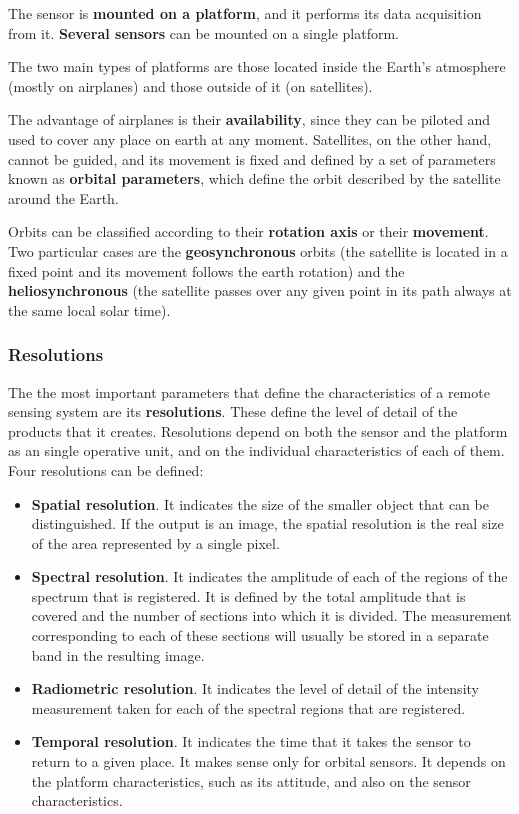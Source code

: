 The sensor is \textbf{mounted on a platform}, and it performs its data acquisition from it. \textbf{Several sensors} can be mounted on a single platform.

The two main types of platforms are those located inside the Earth's atmosphere (mostly on airplanes) and those outside of it (on satellites).

The advantage of airplanes is their \textbf{availability}, since they can be piloted and used to cover any place on earth at any moment. Satellites, on the other hand, cannot be guided, and its movement is fixed and defined by a set of parameters known as \textbf{orbital parameters}, which define the orbit described by the satellite around the Earth.

Orbits can be classified according to their \textbf{rotation axis} or their \textbf{movement}. Two particular cases are the \textbf{geosynchronous} orbits (the satellite is located in a fixed point and its movement follows the earth rotation) and the \textbf{heliosynchronous} (the satellite passes over any given point in its path always at the same local solar time).
	
\subsubsection{Resolutions}

The the most important parameters that define the characteristics of a remote sensing system are its \textbf{resolutions}. These define the level of detail of the products that it creates. Resolutions depend on both the sensor and the platform as an single operative unit, and on the individual characteristics of each of them. Four resolutions can be defined:

\begin{itemize}
	\item \textbf{Spatial resolution}. It indicates the size of the smaller object that can be distinguished. If the output is an image, the spatial resolution is the real size of the area represented by a single pixel.
	\item \textbf{Spectral resolution}. It indicates the amplitude of each of the regions of the spectrum that is registered. It is defined by the total amplitude that is covered and the number of sections into which it is divided. The measurement corresponding to each of these sections will usually be stored in a separate band in the resulting image. 
	\item \textbf{Radiometric resolution}. It indicates the level of detail of the intensity measurement taken for each of the spectral regions that are registered. 
	\item \textbf{Temporal resolution}. It indicates the time that it takes the sensor to return to a given place. It makes sense only for orbital sensors. It depends on the platform characteristics, such as its attitude, and also on the sensor characteristics.
\end{itemize}

